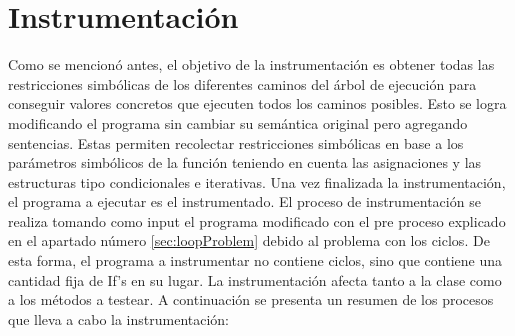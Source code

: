 \documentclass{llncs}
\begin{document}
\section{Instrumentación}
Como se mencionó antes, el objetivo de la instrumentación es obtener todas las restricciones simbólicas de los diferentes caminos del árbol de
ejecución para conseguir valores concretos que ejecuten todos los caminos posibles. Esto se logra modificando el programa sin cambiar su semántica original
pero agregando sentencias. Estas permiten recolectar restricciones simbólicas en base a los parámetros simbólicos de la función teniendo en cuenta las asignaciones
y las estructuras tipo condicionales e iterativas. Una vez finalizada la instrumentación, el programa a ejecutar es el instrumentado.
El proceso de instrumentación se realiza tomando como input el programa modificado con el pre proceso explicado en el apartado número \ref{sec:loopProblem}
debido al problema con los ciclos. De esta forma, el programa a instrumentar no contiene ciclos, sino que contiene una cantidad fija de If’s en su lugar.
La instrumentación afecta tanto a la clase como a los métodos a testear. A continuación se presenta un resumen de los procesos que lleva a cabo la instrumentación:
\end{document}

